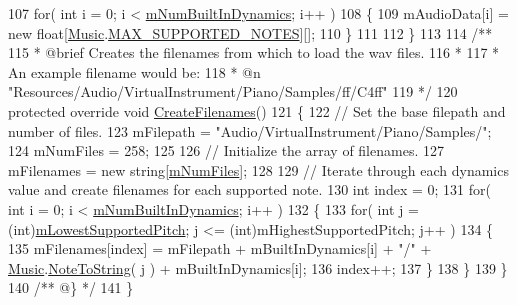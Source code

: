 \begin{DoxyCodeInclude}
107         \textcolor{keywordflow}{for}( \textcolor{keywordtype}{int} i = 0; i < \hyperlink{group___v_i_base_pro_var_gac265f64f759d267ee1e1680f8d387011}{mNumBuiltInDynamics}; i++ )
108         \{
109             mAudioData[i] = \textcolor{keyword}{new} \textcolor{keywordtype}{float}[\hyperlink{class_music}{Music}.\hyperlink{group___music_constants_gaaf07da909a12e9fec0e43b70864f27b7}{MAX\_SUPPORTED\_NOTES}][];
110         \}
111 
112     \}
113 \textcolor{comment}{}
114 \textcolor{comment}{    /**}
115 \textcolor{comment}{     * @brief Creates the filenames from which to load the wav files.}
116 \textcolor{comment}{     * }
117 \textcolor{comment}{     * An example filename would be:}
118 \textcolor{comment}{     * @n "Resources/Audio/VirtualInstrument/Piano/Samples/ff/C4ff"}
119 \textcolor{comment}{    */}
120     \textcolor{keyword}{protected} \textcolor{keyword}{override} \textcolor{keywordtype}{void} \hyperlink{group___piano_virt_func_gaafd50f0f04ea7ea4f560accc628b8f1b}{CreateFilenames}()
121     \{
122         \textcolor{comment}{// Set the base filepath and number of files.}
123         mFilepath = \textcolor{stringliteral}{"Audio/VirtualInstrument/Piano/Samples/"};
124         mNumFiles = 258;
125 
126         \textcolor{comment}{// Initialize the array of filenames.}
127         mFilenames = \textcolor{keyword}{new} \textcolor{keywordtype}{string}[\hyperlink{group___v_i_base_pro_var_ga9a602db8c9833ce75d95dd453c27d341}{mNumFiles}];
128 
129         \textcolor{comment}{// Iterate through each dynamics value and create filenames for each supported note.}
130         \textcolor{keywordtype}{int} index = 0;
131         \textcolor{keywordflow}{for}( \textcolor{keywordtype}{int} i = 0; i < \hyperlink{group___v_i_base_pro_var_gac265f64f759d267ee1e1680f8d387011}{mNumBuiltInDynamics}; i++ )
132         \{
133             \textcolor{keywordflow}{for}( \textcolor{keywordtype}{int} j = (\textcolor{keywordtype}{int})\hyperlink{group___v_i_base_pro_var_ga3cae52b1bcc0178a8a6b03c7aaf7aac8}{mLowestSupportedPitch}; j <= (int)mHighestSupportedPitch;
       j++ )
134             \{
135                 mFilenames[index] = mFilepath + mBuiltInDynamics[i] + \textcolor{stringliteral}{"/"} + 
      \hyperlink{class_music}{Music}.\hyperlink{group___music_stat_func_ga85a22c905d56d4c5f4e62159bfecee8c}{NoteToString}( j ) + mBuiltInDynamics[i];
136                 index++;
137             \}
138         \}
139     \}\textcolor{comment}{}
140 \textcolor{comment}{    /** @\} */}
141 \}
\end{DoxyCodeInclude}
 